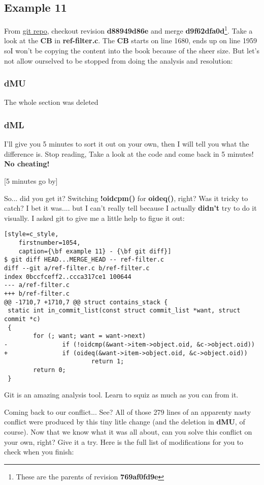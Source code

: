 \subsection{Example 11}

From \hyperref[git_repo]{git repo}, checkout revision {\bf d88949d86e} and merge {\bf d9f62dfa0d}\footnote{These are the parents
of revision {\bf 769af0fd9e}}. Take a look at the {\bf CB} in {\bf ref-filter.c}. The {\bf CB} starts on line 1680, ends up on line
1959 soI won't be copying the content into the book because of the sheer size. But let's not allow ourselved to be stopped from
doing the analysis and resolution:

\subsubsection{dMU}
The whole section was deleted

\subsubsection{dML}
I'll give you 5 minutes to sort it out on your own, then I will tell you what the difference is. Stop reading,
Take a look at the code and come back in 5 minutes! {\bf No cheating!}

[5 minutes go by]

So... did you get it? Switching {\bf !oidcpm()} for {\bf oideq()}, right? Was it tricky to catch? I bet it was.... but I
can't really tell because I actually {\bf didn't} try to do it visually. I asked git to give me a little help to figue it out:

\begin{lstlisting}[style=c_style,
	firstnumber=1054,
	caption={\bf example 11} - {\bf git diff}]
$ git diff HEAD...MERGE_HEAD -- ref-filter.c
diff --git a/ref-filter.c b/ref-filter.c
index 0bccfceff2..ccca317ce1 100644
--- a/ref-filter.c
+++ b/ref-filter.c
@@ -1710,7 +1710,7 @@ struct contains_stack {
 static int in_commit_list(const struct commit_list *want, struct commit *c)
 {
        for (; want; want = want->next)
-               if (!oidcmp(&want->item->object.oid, &c->object.oid))
+               if (oideq(&want->item->object.oid, &c->object.oid))
                        return 1;
        return 0;
 }
\end{lstlisting}
Git is an amazing analysis tool. Learn to squiz as much as you can from it.

Coming back to our conflict... See? All of those 279 lines of an apparenty nasty conflict were produced by this tiny
litle change (and the deletion in {\bf dMU}, of course). Now that we know what it was all about, can you solve this conflict
on your own, right? Give it a try. Here is the full list of modifications for you to check when you finish:

